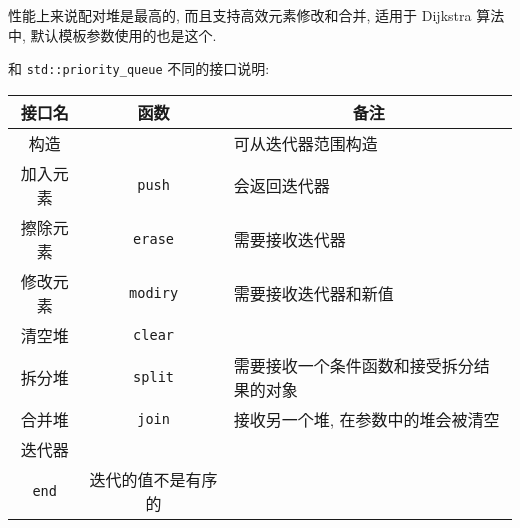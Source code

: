 性能上来说配对堆是最高的, 而且支持高效元素修改和合并, 适用于 Dijkstra 算法中, 默认模板参数使用的也是这个.

和 \lstinline{std::priority_queue} 不同的接口说明:

\begin{center}
  \begin{tabular}{ccl}
    \toprule
    \textbf{接口名} & \textbf{函数} & \multicolumn{1}{c}{\textbf{备注}} \\
    \toprule
    构造 & & 可从迭代器范围构造 \\
    \midrule
    加入元素 & \lstinline|push| & 会返回迭代器 \\
    \midrule
    擦除元素 & \lstinline|erase| & 需要接收迭代器 \\
    \midrule
    修改元素 & \lstinline|modiry| & 需要接收迭代器和新值 \\
    \midrule
    清空堆 & \lstinline|clear| & \\
    \midrule
    拆分堆 & \lstinline|split| & 需要接收一个条件函数和接受拆分结果的对象 \\
    \midrule
    合并堆 & \lstinline|join| & 接收另一个堆, 在参数中的堆会被清空 \\
    \midrule
    迭代器 & \makecell{\lstinline|begin|\\\lstinline|end|} & 迭代的值不是有序的 \\
    \bottomrule
  \end{tabular}
\end{center}
